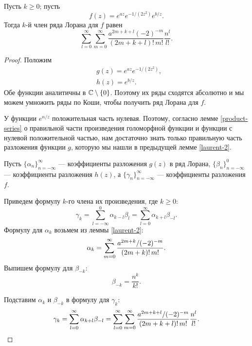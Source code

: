 \documentclass[../paper.tex]{subfiles}
\begin{document}
\begin{Lem}
\label{laurent-3}
Пусть $k \ge 0$; пусть
\[
	f(z) = e^{az} e^{-1/(2z^2)} e^{b/z}
.\]
Тогда $k$-й член ряда Лорана для $f$ равен
\[
	\sum_{l=0}^{\infty}
	\sum_{m=0}^{\infty} \frac{a^{2m+k+l} (-2)^{-m}}{(2m+k+l)!\,m!}
	\frac{n^l}{l!}
.\]
\end{Lem}
\begin{proof}
Положим
\begin{align*}
	& g(z) = e^{az} e^{-1/(2z^2)}, \\
	& h(z) = e^{b/z}
.\end{align*}
Обе функции аналитичны в $\mathbb{C} \setminus \{0\}$.
Поэтому их ряды сходятся абсолютно и мы можем умножить ряды по Коши, чтобы получить ряд Лорана для $f$.

У функции $e^{n/z}$ положительная часть нулевая.
Поэтому, согласно лемме \ref{product-series} о правильной части произведения голоморфной функции и функции с нулевой положительной частью, 
нам достаточно знать только правильную часть разложения функции $g$, которую мы нашли в предыдущей лемме \ref{laurent-2}.

Пусть $\{\alpha_n\}_{n=-\infty}^\infty$ --- коэффициенты разложения $g(z)$ в ряд Лорана, $\{\beta_n\}_{n=-\infty}^0$ --- коэффициенты разложения $h(z)$,
а $\{\gamma_n\}_{n=-\infty}^\infty$ --- коэффициенты разложения~$f$.

Приведем формулу $k$-го члена их произведения, где $k \ge 0$:
\[
    \gamma_k =
    \sum_{l=-\infty}^{0} \alpha_{k-l} \beta_l =
    \sum_{l=0}^{\infty} \alpha_{k+l} \beta_{-l}
.\]
Формулу для $\alpha_k$ возьмем из леммы \ref{laurent-2}:
\[
	\alpha_k = \sum_{m=0}^{\infty} \frac{a^{2m+k} / (-2)^{-m}}{(2m+k)!\,m!} \\
.\]
Выпишем формулу для $\beta_{-k}$:
\[
	\beta_{-k} = \frac{n^k}{k!}
.\]

Подставим $\alpha_k$ и $\beta_{-k}$ в формулу для $\gamma_k$:
\[
    \gamma_k =
    \sum_{l=0}^{\infty} \alpha_{k+l} \beta_{-l} =
%
    \sum_{l=0}^{\infty}
    \sum_{m=0}^{\infty} \frac{a^{2m+k+l} / (-2)^{-m}}{(2m+k+l)!\,m!} \\
    \frac{n^l}{l!}
.\]
\end{proof}
\end{document}
